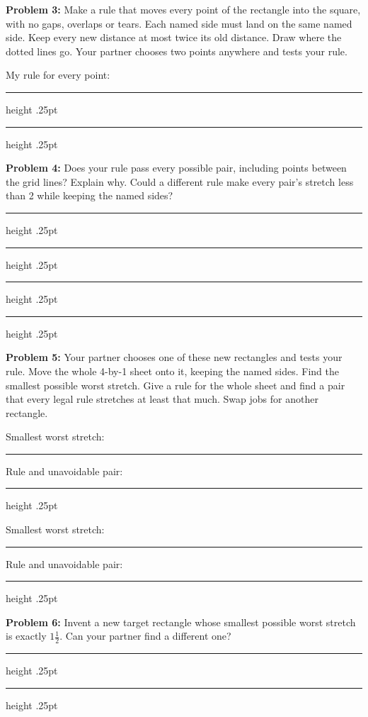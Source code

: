 \documentclass[11pt,letterpaper]{article}
\newcommand{\problem}[2]{\textbf{Problem #1:} #2\par}
\newcommand{\answerline}{\par\vspace{.32in}\hrule height .25pt}
\begin{document}
\newpage

\problem{3}{Make a rule that moves every point of the rectangle into the square, with no gaps, overlaps or tears. Each named side must land on the same named side. Keep every new distance at most twice its old distance. Draw where the dotted lines go. Your partner chooses two points anywhere and tests your rule.}

\begin{center}\end{center}
My rule for every point:
\answerline\answerline
\vspace{.25in}

\problem{4}{Does your rule pass every possible pair, including points between the grid lines? Explain why. Could a different rule make every pair's stretch less than 2 while keeping the named sides?}

\answerline\answerline\answerline\answerline

\newpage

\problem{5}{Your partner chooses one of these new rectangles and tests your rule. Move the whole 4-by-1 sheet onto it, keeping the named sides. Find the smallest possible worst stretch. Give a rule for the whole sheet and find a pair that every legal rule stretches at least that much. Swap jobs for another rectangle.}

\begin{center}\end{center}
Smallest worst stretch: \rule{.7in}{.3pt}\quad Rule and unavoidable pair:
\answerline
\begin{center}\end{center}
Smallest worst stretch: \rule{.7in}{.3pt}\quad Rule and unavoidable pair:
\answerline
\vspace{.13in}

\problem{6}{Invent a new target rectangle whose smallest possible worst stretch is exactly $1\frac12$. Can your partner find a different one?}

\answerline\answerline
\end{document}
